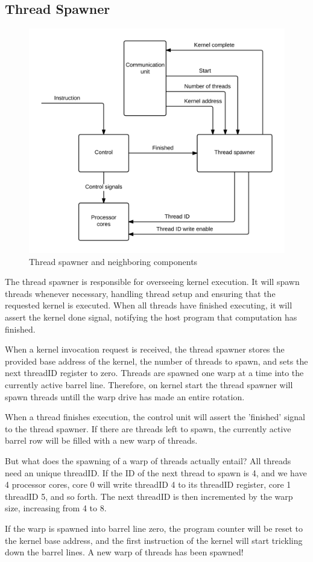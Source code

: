 \subsection{Thread Spawner}

\begin{figure}[H]
	\centering
	\includegraphics[width=\textwidth]{../gpu/diagrams/thread_spawner.png}
	\caption{Thread spawner and neighboring components}
	\label{fig:thread_spawner}
\end{figure}

The thread spawner is responsible for overseeing kernel execution.
It will spawn threads whenever necessary, handling thread setup and ensuring that the requested kernel is executed.
When all threads have finished executing, it will assert the kernel done signal, notifying the host program that computation has finished.

When a kernel invocation request is received, the thread spawner stores the provided base address of the kernel, the number of threads to spawn, and sets the next threadID register to zero.
Threads are spawned one warp at a time into the currently active barrel line.
Therefore, on kernel start the thread spawner will spawn threads untill the warp drive has made an entire rotation.

When a thread finishes execution, the control unit will assert the 'finished' signal to the thread spawner.
If there are threads left to spawn, the currently active barrel row will be filled with a new warp of threads.

But what does the spawning of a warp of threads actually entail?
All threads need an unique threadID.
If the ID of the next thread to spawn is 4, and we have 4 processor cores,
core 0 will write threadID 4 to its threadID register, core 1 threadID 5, and so forth.
The next threadID is then incremented by the warp size, increasing from 4 to 8.

If the warp is spawned into barrel line zero, the program counter will be reset to the kernel base address, and the first instruction of the kernel will start trickling down the barrel lines.
A new warp of threads has been spawned!
